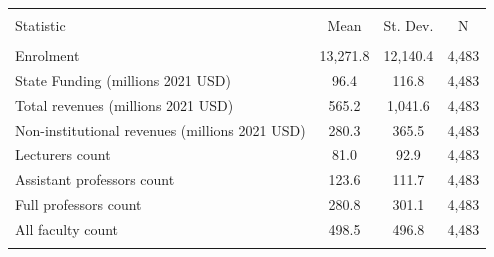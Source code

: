 
\begin{tabular}{@{\extracolsep{5pt}}lccc} 
\\[-1.8ex]\hline 
\hline \\[-1.8ex] 
Statistic & \multicolumn{1}{c}{Mean} & \multicolumn{1}{c}{St. Dev.} & \multicolumn{1}{c}{N} \\ 
\hline \\[-1.8ex] 
Enrolment & 13,271.8 & 12,140.4 & 4,483 \\ 
State Funding (millions 2021 USD) & 96.4 & 116.8 & 4,483 \\ 
Total revenues (millions 2021 USD) & 565.2 & 1,041.6 & 4,483 \\ 
Non-institutional revenues (millions 2021 USD) & 280.3 & 365.5 & 4,483 \\ 
Lecturers count & 81.0 & 92.9 & 4,483 \\ 
Assistant professors count & 123.6 & 111.7 & 4,483 \\ 
Full professors count & 280.8 & 301.1 & 4,483 \\ 
All faculty count & 498.5 & 496.8 & 4,483 \\ 
\hline \\[-1.8ex] 
\end{tabular} 
